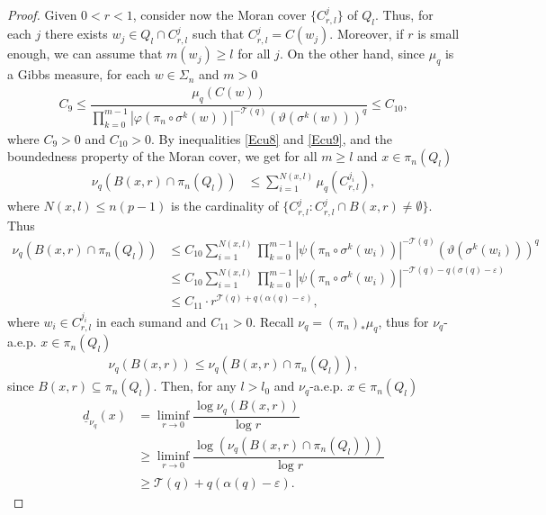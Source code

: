 \documentclass[11pt]{amsart}
\theoremstyle{remark}
\numberwithin{equation}{section}
\begin{document}
\begin{proof}
Given $0<r<1$, consider now the Moran cover $\{C^{j}_{r,l}\}$ of $Q_{l}$. Thus, for each $j$ there exists $w_{j}\in Q_{l}\cap C_{r,l}^{j}$ such that $C_{r,l}^{j}=C(w_{j})$. Moreover, if $r$ is small enough, we can assume that $m(w_{j})\geq l$ for all $j$. On the other hand, since $\mu_{q}$ is a Gibbs measure, for each $w\in \Sigma_{n}$ and $m>0$
\begin{align}\label{Ecu9}
    C_{9}\leq  \dfrac{\mu_{q}(C(w))}{\prod^{m-1}_{k=0}|\varphi  (\pi_{n}\circ \sigma^{k}(w))|^{-\mathcal{T}(q)}(\vartheta(\sigma^{k}(w)))^{q}}\leq C_{10},
\end{align}where $C_{9}>0$ and $C_{10}>0$. By inequalities \eqref{Ecu8} and \eqref{Ecu9}, and the boundedness property of the Moran cover, we get for all $m\geq l$ and $x\in \pi_{n}(Q_{l})$
\begin{align*}
    \nu_{q}(B(x,r)\cap \pi_{n}(Q_{l})) & \leq \sum^{N(x,l)}_{i=1}\mu_{q}(C^{j_{i}}_{r,l}),
    \end{align*} where $N(x,l)\leq n(p-1)$ is the cardinality of $\{C_{r,l}^{j}:C_{r,l}^{j}\cap B(x,r)\neq \emptyset\}$. Thus
    \begin{align*}
   \nu_{q}(B(x,r)\cap \pi_{n}(Q_{l}))  & \leq  C_{10}\sum^{N(x,l)}_{i=1}\prod^{m-1}_{k=0}|\psi(\pi_{n}\circ \sigma^{k}(w_{i}))|^{-\mathcal{T}(q)}(\vartheta(\sigma^{k}(w_{i})))^{q}\\
    & \leq C_{10}\sum^{N(x,l)}_{i=1}\prod^{m-1}_{k=0}|\psi(\pi_{n}\circ \sigma^{k}(w_{i}))|^{-\mathcal{T}(q)-q(\sigma(q)-\varepsilon)}\\
    & \leq C_{11}\cdot r^{\mathcal{T}(q)+q(\alpha(q)-\varepsilon)},
\end{align*}where $w_{i}\in C_{r,l}^{j_{i}}$ in each sumand and $C_{11}>0$. Recall $\nu_{q}=(\pi_{n})_{*} \mu_{q}$, thus for $\nu_{q}$-a.e.p. $x\in \pi_{n}(Q_{l})$ 
\begin{align*}
    \nu_{q}(B(x,r))\leq \nu_{q}(B(x,r)\cap \pi_{n}(Q_{l})),
\end{align*} since $B(x,r)\subseteq \pi_{n}(Q_{l})$. Then, for any $l>l_{0}$ and $\nu_{q}$-a.e.p. $x\in \pi_{n}(Q_{l})$ 
\begin{align*}
    \underline{d}_{\nu_{q}}(x)& = \liminf_{r\to 0}\dfrac{\log \nu_{q}(B(x,r))}{\log r}\\
    & \geq \liminf_{r\to 0}\dfrac{\log(\nu_{q}(B(x,r)\cap \pi_{n}(Q_{l})))}{\log r}\\
   & \geq \mathcal{T}(q)+q(\alpha(q)-\varepsilon).

\end{align*}
\end{proof}
\end{document}
